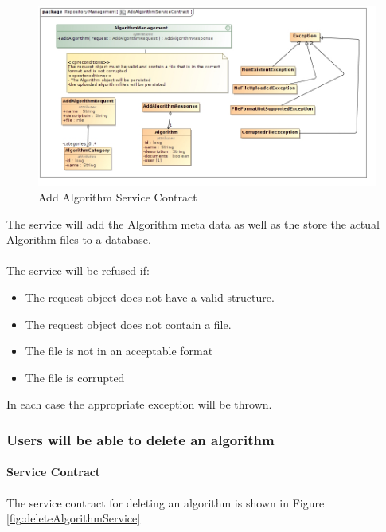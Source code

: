 \begin{figure}[H]
  \begin{center}
  \includegraphics[scale=0.5]{../Diagrams and Charts/Test Data/AddAlgorithmServiceContract.jpg}
  \caption{Add Algorithm Service Contract}
  \label{fig:addAlgorithmService}
  \end{center}  
 \end{figure}

 The service will add the Algorithm meta data as well as the store the
 actual Algorithm files to a database.\\\\
 The service will be refused if:\\
	 \begin{itemize}
	 	\item The request object does not have a valid structure.	 	
	 	\item The request object does not contain a file.
	 	\item The file is not in an acceptable format
	 	\item The file is corrupted
	 \end{itemize}
In each case the appropriate exception will be thrown.

\subsubsection {Users will be able to delete an algorithm}
\paragraph{Service Contract}
The service contract for deleting an algorithm is shown in Figure \ref{fig:deleteAlgorithmService}

